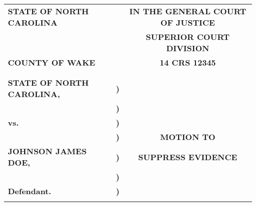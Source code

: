 \documentclass{article}
\newcommand{\casecaption}{%

\begin{tabular}{l c c}
\uppercase{\textbf{state of north carolina}}  &   & \uppercase{\textbf{In the General Court of Justice}} \\
                                              &   & \uppercase{\textbf{Superior Court Division}} \\
\uppercase{\textbf{County of Wake}}           &   & \uppercase{\textbf{14 CRS 12345}} \\
                                              &   & \\
                                              &   & \\
\uppercase{\textbf{State of North Carolina,}} & \textbf{)} & \\
                                              & \textbf{)} & \\
\textbf{vs.}                                  & \textbf{)} & \\
                                              & \textbf{)} & \uppercase{\textbf{Motion to}} \\
\uppercase{\textbf{Johnson James Doe,}}       & \textbf{)} & \uppercase{\textbf{Suppress Evidence}} \\
                                              & \textbf{)} & \\
                     \textbf{Defendant.}      & \textbf{)} & \\
                                              &   & \\

\hline
\end{tabular}

}
\begin{document}
\casecaption{}
\end{document}

